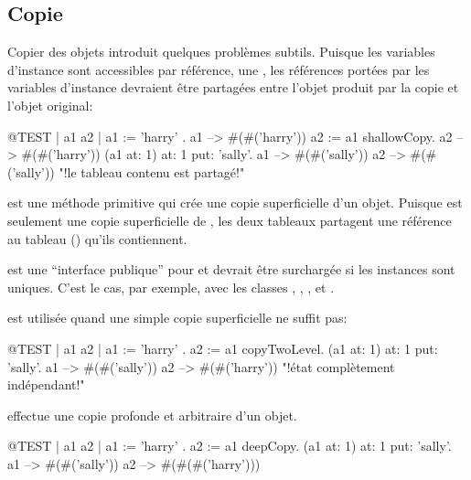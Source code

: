 \documentclass[a4paper,10pt,twoside]{book}
\begin{document}
\subsection{Copie}

Copier des objets introduit quelques problèmes subtils. Puisque les variables 
d'instance sont accessibles par référence, une , 
les références portées par les variables d'instance devraient être partagées entre l'objet 
produit par la copie et l'objet original:

\begin{code}{@TEST | a1 a2 |}
a1 := { { 'harry' } }.
a1 --> #(#('harry'))
a2 := a1 shallowCopy.
a2 --> #(#('harry'))
(a1 at: 1) at: 1 put: 'sally'.
a1 --> #(#('sally'))
a2 --> #(#('sally'))    "!le tableau contenu est partagé!"
\end{code}

 est une méthode primitive qui crée une copie superficielle d'un objet. Puisque  est seulement une copie superficielle de , les deux tableaux partagent une référence au tableau () qu'ils contiennent.

 est une ``interface publique'' pour  et devrait être surchargée si les instances sont uniques. C'est le cas, par exemple, avec les classes , , ,  et .

 est utilisée quand une simple copie superficielle ne suffit pas:

\begin{code}{@TEST | a1 a2 |}
a1 := { { 'harry' } } .
a2 := a1 copyTwoLevel.
(a1 at: 1) at: 1 put: 'sally'.
a1 --> #(#('sally'))
a2 --> #(#('harry'))    "!état complètement indépendant!"
\end{code}

 effectue une copie profonde et arbitraire d'un objet.

\begin{code}{@TEST | a1 a2 |}
a1 := { { { 'harry' } } } .
a2 := a1 deepCopy.
(a1 at: 1) at: 1 put: 'sally'.
a1 --> #(#('sally'))
a2 --> #(#(#('harry')))
\end{code}
\end{document}
